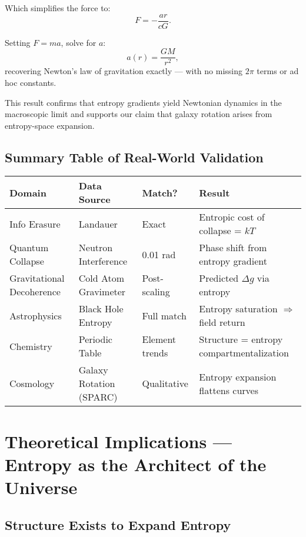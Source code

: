 \documentclass[12pt]{article}
\begin{document}
Which simplifies the force to:
\[
F = -\frac{a r}{c G}.
\]

Setting $F = m a$, solve for $a$:
\[
a(r) = \frac{G M}{r^2},
\]
recovering Newton’s law of gravitation exactly — with no missing $2\pi$ terms or ad hoc constants.

This result confirms that entropy gradients yield Newtonian dynamics in the macroscopic limit and supports our claim that galaxy rotation arises from entropy-space expansion.


\subsection*{Summary Table of Real-World Validation}

\vspace{0.5em}
\begin{small}
\begin{center}
\begin{tabular}{|p{3cm}|p{3.5cm}|p{2.5cm}|p{5.5cm}|}
\hline
\textbf{Domain} & \textbf{Data Source} & \textbf{Match?} & \textbf{Result} \\
\hline
Info Erasure & Landauer &  Exact & Entropic cost of collapse = $kT$ \\
\hline
Quantum Collapse & Neutron Interference &  0.01 rad & Phase shift from entropy gradient \\
\hline
Gravitational Decoherence & Cold Atom Gravimeter &  Post-scaling & Predicted $\Delta g$ via entropy \\
\hline
Astrophysics & Black Hole Entropy &  Full match & Entropy saturation $\Rightarrow$ field return \\
\hline
Chemistry & Periodic Table &  Element trends & Structure = entropy compartmentalization \\
\hline
Cosmology & Galaxy Rotation (SPARC) &  Qualitative & Entropy expansion flattens curves \\
\hline
\end{tabular}
\end{center}
\end{small}

\section{Theoretical Implications — Entropy as the Architect of the Universe}

\subsection{Structure Exists to Expand Entropy}
\end{document}
